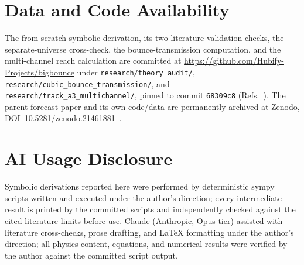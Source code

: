 \documentclass[aps,prd,reprint,superscriptaddress,showpacs,preprintnumbers,nofootinbib,longbibliography,floatfix]{revtex4-2}
\begin{document}
\section*{Data and Code Availability}
The from-scratch symbolic derivation, its two literature validation checks, the
separate-universe cross-check, the bounce-transmission computation, and the
multi-channel reach calculation are committed at
\url{https://github.com/Hubify-Projects/bigbounce} under
\texttt{research/theory\_audit/}, \texttt{research/cubic\_bounce\_transmission/}, and
\texttt{research/track\_a3\_multichannel/}, pinned to commit
\texttt{68309c8} (Refs.~\cite{Golden2026TheoryAudit,Golden2026Transmission,%
Golden2026Multichannel}). The parent forecast paper and its own code/data are
permanently archived at Zenodo, DOI~10.5281/zenodo.21461881~\cite{Golden2026P2Zenodo}.

\section*{AI Usage Disclosure}
Symbolic derivations reported here were performed by deterministic sympy scripts written
and executed under the author's direction; every intermediate result is printed by the
committed scripts and independently checked against the cited literature limits before
use. Claude (Anthropic, Opus-tier) assisted with literature cross-checks, prose drafting,
and LaTeX formatting under the author's direction; all physics content, equations, and
numerical results were verified by the author against the committed script output.


\end{document}
